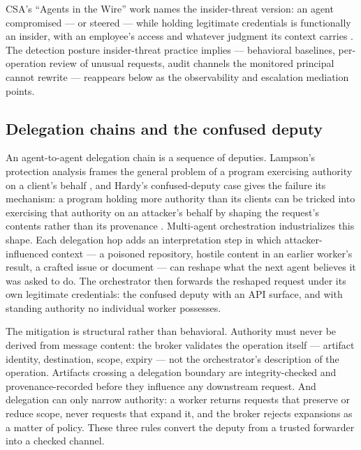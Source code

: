 \documentclass[
  english,
  9pt,
]{extarticle}
\begin{document}
CSA's ``Agents in the Wire'' work names the insider-threat version: an
agent compromised --- or steered --- while holding legitimate
credentials is functionally an insider, with an employee's access and
whatever judgment its context carries \citep{csa_agent_insider}. The
detection posture insider-threat practice implies --- behavioral
baselines, per-operation review of unusual requests, audit channels the
monitored principal cannot rewrite \citep{nist_sp800_207} --- reappears
below as the observability and escalation mediation points.

\subsection{Delegation chains and the confused
deputy}\label{delegation-chains-and-the-confused-deputy}

An agent-to-agent delegation chain is a sequence of deputies. Lampson's
protection analysis frames the general problem of a program exercising
authority on a client's behalf \citep{lampson1974}, and Hardy's
confused-deputy case gives the failure its mechanism: a program holding
more authority than its clients can be tricked into exercising that
authority on an attacker's behalf by shaping the request's contents
rather than its provenance \citep{hardy1988}. Multi-agent orchestration
industrializes this shape. Each delegation hop adds an interpretation
step in which attacker-influenced context --- a poisoned repository,
hostile content in an earlier worker's result, a crafted issue or
document --- can reshape what the next agent believes it was asked to
do. The orchestrator then forwards the reshaped request under its own
legitimate credentials: the confused deputy with an API surface, and
with standing authority no individual worker possesses.

The mitigation is structural rather than behavioral. Authority must
never be derived from message content: the broker validates the
operation itself --- artifact identity, destination, scope, expiry ---
not the orchestrator's description of the operation. Artifacts crossing
a delegation boundary are integrity-checked and provenance-recorded
before they influence any downstream request. And delegation can only
narrow authority: a worker returns requests that preserve or reduce
scope, never requests that expand it, and the broker rejects expansions
as a matter of policy. These three rules convert the deputy from a
trusted forwarder into a checked channel.
\end{document}
